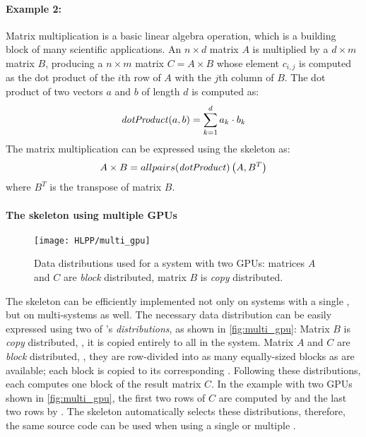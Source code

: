 \paragraph{Example 2:}
Matrix multiplication is a basic linear algebra operation, which is a building block of many scientific applications.
An $n\times d$ matrix $A$ is multiplied by a $d\times m$ matrix $B$, producing a $n\times m$ matrix $C=A\times B$ whose element $c_{i,j}$ is computed as the dot product of the $i$th row of $A$ with the $j$th column of $B$.
The dot product of two vectors $a$ and $b$ of length $d$ is computed as:
\begin{equation}
  \mbox{\emph{dotProduct}} (a,b) = \sum_{k=1}^d a_k \cdot b_k
\end{equation}
The matrix multiplication can be expressed using the \allpairs skeleton as:
\begin{equation}
  A\times B = allpairs(\mbox{\emph{dotProduct}})\left(A, B^T\right)
  \label{eq:mat_mult_allpairs}
\end{equation}
where $B^T$ is the transpose of matrix $B$.

\paragraph{The \allpairs skeleton using multiple GPUs}
\label{sec:allpairs:multi_gpu}
\begin{figure}[b]
  \centering
  \texttt{[image: HLPP/multi\_gpu]}
  \caption{Data distributions used for a system with two GPUs: matrices $A$ and $C$ are \emph{block} distributed, matrix $B$ is \emph{copy} distributed.}
  \label{fig:multi_gpu}
\end{figure}

The \allpairs skeleton can be efficiently implemented not only on systems with a single \GPU, but on multi-\GPU systems as well.
The necessary data distribution can be easily expressed using two of \SkelCL's \emph{distributions}, as shown in \autoref{fig:multi_gpu}:
Matrix $B$ is \emph{copy} distributed, \ie, it is copied entirely to all \GPUs in the system.
Matrix $A$ and $C$ are \emph{block} distributed, \ie, they are row-divided into as many equally-sized blocks as \GPUs are available;
each block is copied to its corresponding \GPU.
Following these distributions, each \GPU computes one block of the result matrix $C$.
In the example with two GPUs shown in \autoref{fig:multi_gpu}, the first two rows of $C$ are computed by  and the last two rows by .
The \allpairs skeleton automatically selects these distributions, therefore, the same source code can be used when using a single \GPU or multiple \GPUs.



